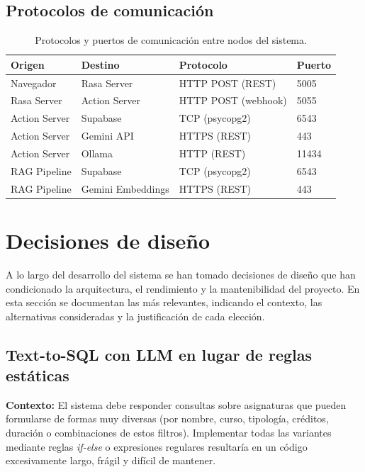 \subsection{Protocolos de comunicación}

\begin{table}[hbtp]
\centering
\begin{tabular}{|l|l|l|l|}
\hline
\textbf{Origen} & \textbf{Destino} & \textbf{Protocolo} & \textbf{Puerto} \\ \hline
Navegador & Rasa Server & HTTP POST (REST) & 5005 \\ \hline
Rasa Server & Action Server & HTTP POST (webhook) & 5055 \\ \hline
Action Server & Supabase & TCP (psycopg2) & 6543 \\ \hline
Action Server & Gemini API & HTTPS (REST) & 443 \\ \hline
Action Server & Ollama & HTTP (REST) & 11434 \\ \hline
RAG Pipeline & Supabase & TCP (psycopg2) & 6543 \\ \hline
RAG Pipeline & Gemini Embeddings & HTTPS (REST) & 443 \\ \hline
\end{tabular}
\caption{Protocolos y puertos de comunicación entre nodos del sistema.}
\label{tab:protocolos}
\end{table}


\section{Decisiones de diseño}\label{sec:decisiones-diseno}

A lo largo del desarrollo del sistema se han tomado decisiones de diseño que han condicionado la arquitectura, el rendimiento y la mantenibilidad del proyecto. En esta sección se documentan las más relevantes, indicando el contexto, las alternativas consideradas y la justificación de cada elección.

\subsection{Text-to-SQL con LLM en lugar de reglas estáticas}\label{subsec:dd-texttosql}

\textbf{Contexto:} El sistema debe responder consultas sobre asignaturas que pueden formularse de formas muy diversas (por nombre, curso, tipología, créditos, duración o combinaciones de estos filtros). Implementar todas las variantes mediante reglas \textit{if-else} o expresiones regulares resultaría en un código excesivamente largo, frágil y difícil de mantener.

